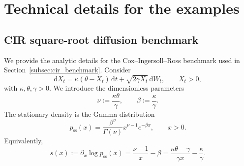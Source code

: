 \documentclass[11pt,twoside,fleqn]{article}
\renewcommand{\d}{\mathrm{d}}
\begin{document}
\section{Technical details for the examples}
\label{app:examples_details}

\subsection{CIR square-root diffusion benchmark}
\label{app:cir_benchmark_details}

We provide the analytic details for the Cox--Ingersoll--Ross benchmark used in Section~\ref{subsec:cir_benchmark}. Consider
\begin{equation}
    \d X_t
    =
    \kappa(\theta-X_t)\,\d t
    +
    \sqrt{2\gamma X_t}\,\d W_t,
    \qquad X_t>0,
    \label{eq:cir_sde_appendix}
\end{equation}
with \(\kappa,\theta,\gamma>0\). We introduce the dimensionless parameters
\begin{equation}
    \nu:=\frac{\kappa\theta}{\gamma},
    \qquad
    \beta:=\frac{\kappa}{\gamma}.
    \label{eq:cir_nu_beta_def}
\end{equation}
The stationary density is the Gamma distribution
\begin{equation}
    p_{\mathrm{ss}}(x)
    =
    \frac{\beta^\nu}{\Gamma(\nu)}
    x^{\nu-1}e^{-\beta x},
    \qquad x>0.
    \label{eq:cir_stationary_density_appendix}
\end{equation}
Equivalently,
\begin{equation}
    s(x)
    :=
    \partial_x\log p_{\mathrm{ss}}(x)
    =
    \frac{\nu-1}{x}-\beta
    =
    \frac{\kappa\theta-\gamma}{\gamma x}
    -
    \frac{\kappa}{\gamma}.
    \label{eq:cir_score_appendix}
\end{equation}
\end{document}
